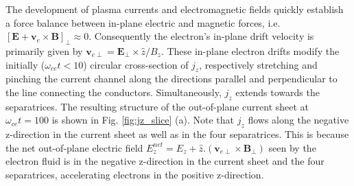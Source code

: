 \documentclass[aip,preprint]{revtex4-1}
\begin{document}
The development of plasma currents and electromagnetic fields quickly establish a force balance between in-plane electric and magnetic forces, i.e. $[\mathbf{E}+\mathbf{v}_e\times\mathbf{B}]_{\perp}\approx 0$.
Consequently the electron's in-plane drift velocity is primarily given by $\mathbf{v}_{e\perp}=\mathbf{E}_{\perp}\times \hat{z}/B_z$.
These in-plane electron drifts modify the initially ($\omega_{ce}t < 10$) circular cross-section of $j_z$, respectively stretching and pinching the current channel along the directions parallel and perpendicular to the line connecting the conductors. Simultaneously, $j_z$ extends towards the separatrices. The resulting structure of the out-of-plane current sheet at $\omega_{ce}t=100$ is shown in Fig. \ref{fig:jz_slice} (a).
Note that $j_z$ flows along the negative z-direction in the current sheet as well as in the four separatrices. This is because the net out-of-plane electric field $E_z^{net}=E_z+\hat{z}.(\mathbf{v}_{e\perp}\times\mathbf{B}_{\perp})$ seen by the electron fluid is in the negative z-direction in the current sheet and the four separatrices, accelerating electrons in the positive z-direction.   

\end{document}
